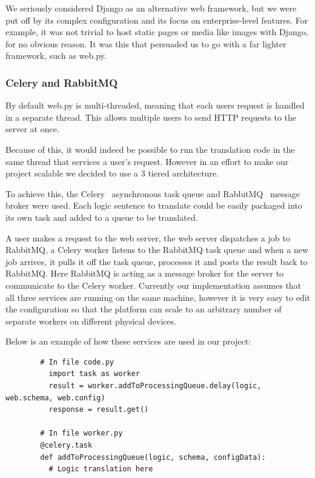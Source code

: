 \documentclass[a4paper, 11pt]{article}
\begin{document}
      We seriously considered Django as an alternative web framework, but we
      were put off by its complex configuration and its focus on
      enterprise-level features. For example, it was not trivial to host static
      pages or media like images with Django, for no obvious reason. It was this
      that persuaded us to go with a far lighter framework, such as web.py.

    \subsubsection{Celery and RabbitMQ}
      By default web.py is multi-threaded, meaning that each users request is
      handled in a separate thread. This allows multiple users to send HTTP
      requests to the server at once.

      Because of this, it would indeed be possible to run the translation code
      in the same thread that services a user's request. However in an effort
      to make our project scalable we decided to use a 3 tiered architecture.

      To achieve this, the Celery~\cite{celery} asynchronous task queue and
      RabbitMQ~\cite{rabbitmq} message broker were used. Each logic sentence to
      translate could be easily packaged into its own task and added to a queue
      to be translated.

      A user makes a request to the web server, the web server dispatches a job
      to RabbitMQ, a Celery worker listens to the RabbitMQ task queue and when a
      new job arrives, it pulls it off the task queue, processes it and posts
      the result back to RabbitMQ. Here RabbitMQ is acting as a message broker
      for the server to communicate to the Celery worker. Currently our
      implementation assumes that all three services are running on the same
      machine, however it is very easy to edit the configuration so that the
      platform can scale to an arbitrary number of separate workers on different
      physical devices.

      Below is an example of how these services are used in our project:
      \begin{verbatim}
        # In file code.py
          import task as worker
          result = worker.addToProcessingQueue.delay(logic, web.schema, web.config)
          response = result.get()

        # In file worker.py
        @celery.task
        def addToProcessingQueue(logic, schema, configData):
          # Logic translation here
      \end{verbatim}
\end{document}
